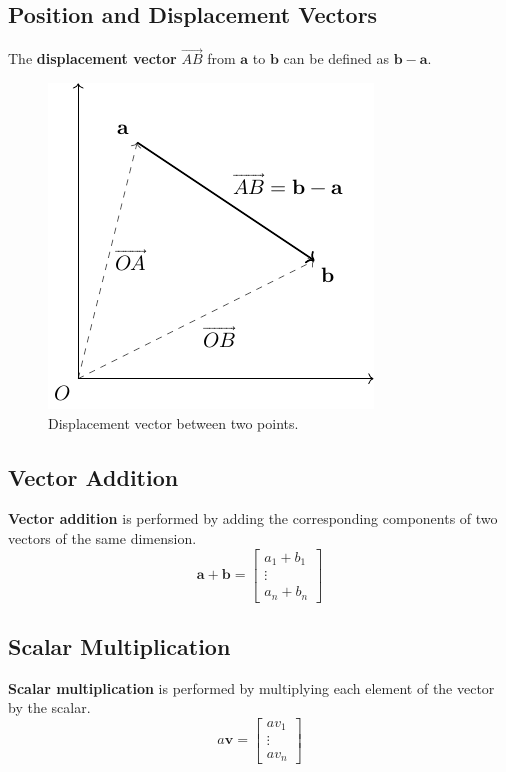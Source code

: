 \documentclass{article}
\begin{document}
\subsection{Position and Displacement Vectors}
\begin{definition}
    The \textbf{displacement vector} \(\overrightarrow{AB}\) from
    \(\symbf{a}\) to \(\symbf{b}\) can be defined as
    \(\symbf{b}-\symbf{a}\).
    \begin{figure}[H]
        \centering
        \includegraphics*{figures/vector_position.pdf}
        \caption{Displacement vector between two points.}
    \end{figure}
\end{definition}
\subsection{Vector Addition}
\begin{definition}
    \textbf{Vector addition} is performed by adding the corresponding
    components of two vectors of the same dimension.
    \begin{equation*}
        \symbf{a} + \symbf{b} =
        \begin{bmatrix}
            a_1+b_1 \\
            \vdots  \\
            a_n+b_n
        \end{bmatrix}
    \end{equation*}
\end{definition}
\subsection{Scalar Multiplication}
\begin{definition}
    \textbf{Scalar multiplication} is performed by multiplying each
    element of the vector by the scalar.
    \begin{equation*}
        a\symbf{v} =
        \begin{bmatrix}
            av_1   \\
            \vdots \\
            av_n
        \end{bmatrix}
    \end{equation*}
\end{definition}
\end{document}
